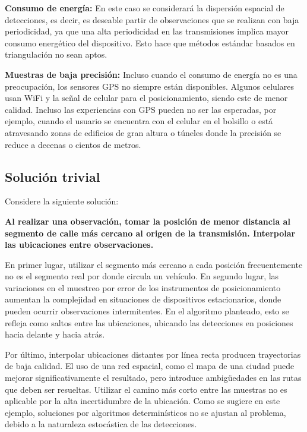 \textbf{Consumo de energía:} En este caso se considerará la dispersión espacial de detecciones, es decir, es deseable partir de observaciones que se realizan con baja periodicidad, ya que una alta periodicidad en las transmisiones implica mayor consumo energético del dispositivo. Esto hace que métodos estándar basados en triangulación no sean aptos. 

\textbf{Muestras de baja precisión:} Incluso cuando el consumo de energía no es una preocupación, los sensores GPS no siempre están disponibles. Algunos celulares usan WiFi y la señal de celular para el posicionamiento, siendo este de menor calidad. Incluso las experiencias con GPS pueden no ser las esperadas, por ejemplo, cuando el usuario se encuentra con el celular en el bolsillo o está atravesando zonas de edificios de gran altura o túneles donde la precisión se reduce a decenas o cientos de metros.

\subsection{Solución trivial}
Considere la siguiente solución:

\begin{adjustwidth}{2cm}{}
\textbf{
Al realizar una observación, tomar la posición de menor distancia al segmento de calle más cercano al origen de la transmisión. Interpolar las ubicaciones entre observaciones.
}
\end{adjustwidth}

En primer lugar, utilizar el segmento más cercano a cada posición frecuentemente no es el segmento real por donde circula un vehículo. En segundo lugar, las variaciones en el muestreo por error de los instrumentos de posicionamiento aumentan la complejidad en situaciones de dispositivos estacionarios, donde pueden ocurrir observaciones intermitentes.  En el algoritmo planteado, esto se refleja como saltos entre las ubicaciones, ubicando las detecciones en posiciones hacia delante y hacia atrás. \par Por último, interpolar ubicaciones distantes por línea recta producen trayectorias de baja calidad. El uso de una red espacial, como el mapa de una ciudad puede mejorar significativamente el resultado, pero introduce ambigüedades en las rutas que deben ser resueltas.
Utilizar el camino más corto entre las muestras no es aplicable por la alta incertidumbre de la ubicación.
Como se sugiere en este ejemplo, soluciones por algoritmos determinísticos no se ajustan al problema, debido a la naturaleza estocástica de las detecciones.

